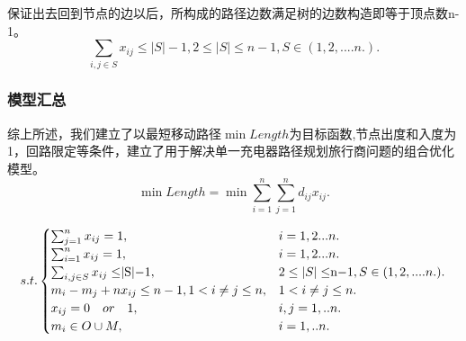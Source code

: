 \documentclass{whutmod}
\begin{document}
保证出去回到节点的边以后，所构成的路径边数满足树的边数构造即等于顶点数n-1。
\begin{equation}
	\sum_{i,j\in S}x_{ij}\leq |S|-1,2\leq |S|\leq n-1, S\in(1,2,....n.).
\end{equation}

\subsubsection{模型汇总}
综上所述，我们建立了以最短移动路径$\min Length$为目标函数,节点出度和入度为1，回路限定等条件，建立了用于解决单一充电器路径规划旅行商问题的组合优化模型。
\begin{equation}
	\min Length=\min\sum_{i=1}^{n}\sum_{j=1}^nd_{ij}x_{ij}.
\end{equation}

\begin{equation}
	s.t.
	\begin{cases} 
		\sum_{j=1}^{n} x_{ij} = 1,&i=1,2...n.\\
		\sum_{i=1}^{n} x_{ij} = 1,&i=1,2...n.\\
		\sum_{i,j\in S}x_{ij}\leq $|S|$-1,& 2\leq |S|\leq $n$-1, S\in(1,2,....n.).\\
		m_i-m_j+nx_{ij}\le n-1,1<i\ne j\le n, & 1<i\ne j\le n. \\
		x_{ij}=0 \quad or \quad 1,& i,j=1,..n.\\
		m_i \in O \cup M,& i=1,..n.
	\end{cases}
\end{equation}
%	




%




\end{document}
